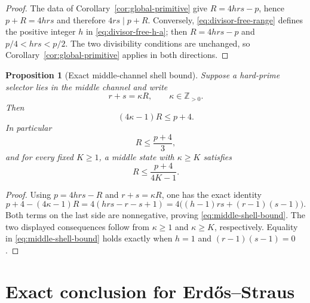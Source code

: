 \documentclass[11pt]{article}
\newtheorem{proposition}[theorem]{Proposition}
\theoremstyle{definition}
\theoremstyle{remark}
\newcommand{\Z}{\mathbb Z}
\begin{document}
\begin{proof}
The data of Corollary~\ref{cor:global-primitive} give
$R=4hrs-p$, hence $p+R=4hrs$ and therefore
$4rs\mid p+R$.  Conversely, \eqref{eq:divisor-free-range} defines the positive
integer $h$ in \eqref{eq:divisor-free-h-a}; then
$R=4hrs-p$ and $p/4<hrs<p/2$.  The two divisibility conditions are unchanged,
so Corollary~\ref{cor:global-primitive} applies in both directions.
\end{proof}

\begin{proposition}[Exact middle-channel shell bound]
\label{prop:middle-shell-bound}
Suppose a hard-prime selector lies in the middle channel and write
\begin{equation}\label{eq:middle-kappa}
 r+s=\kappa R,
 \qquad \kappa\in\Z_{>0}.
\end{equation}
Then
\begin{equation}\label{eq:middle-shell-bound}
 (4\kappa-1)R\le p+4.
\end{equation}
In particular
\begin{equation}\label{eq:middle-shell-one-third}
 R\le\frac{p+4}{3},
\end{equation}
and for every fixed $K\ge1$, a middle state with $\kappa\ge K$ satisfies
\begin{equation}\label{eq:middle-shell-K}
 R\le\frac{p+4}{4K-1}.
\end{equation}
\end{proposition}

\begin{proof}
Using $p=4hrs-R$ and $r+s=\kappa R$, one has the exact identity
\begin{equation}\label{eq:middle-bound-factorization}
 p+4-(4\kappa-1)R
 =4(hrs-r-s+1)
 =4\bigl((h-1)rs+(r-1)(s-1)\bigr).
\end{equation}
Both terms on the last side are nonnegative, proving
\eqref{eq:middle-shell-bound}.  The two displayed consequences follow from
$\kappa\ge1$ and $\kappa\ge K$, respectively.  Equality in
\eqref{eq:middle-shell-bound} holds exactly when $h=1$ and
$(r-1)(s-1)=0$.
\end{proof}

\section{Exact conclusion for Erd\H{o}s--Straus}
\end{document}
